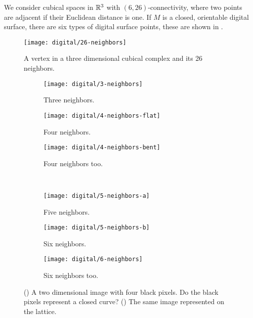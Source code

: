 We consider cubical spaces in $\mathbb{R}^3$ with $(6,26)$-connectivity,
where two points are adjacent if their Euclidean distance is one.
If $M$ is a closed, orientable digital surface, there are
six types of digital surface points, these are shown in .

\begin{figure}[htb]
        \centering
        \texttt{[image: digital/26-neighbors]}
		\caption{A vertex in a three dimensional cubical complex and its 26 neighbors.
		\label{fig:26-neighbors}}
\end{figure}


\begin{figure}[htb]
        \centering
        \begin{subfigure}[b]{0.2\textwidth}
        \texttt{[image: digital/3-neighbors]}
        \caption{Three neighbors.}
          \label{fig:3-neighbors}
        \end{subfigure}
          \hspace{.3cm}
         \begin{subfigure}[b]{0.25\textwidth}
        \texttt{[image: digital/4-neighbors-flat]}
        \caption{Four neighbors.}
        \label{fig:4-neighbors-flat}
        \end{subfigure}
         \hspace{.3cm}
         \begin{subfigure}[b]{0.2\textwidth}
        \texttt{[image: digital/4-neighbors-bent]}
        \caption{Four neighbors too.}
        \label{fig:4-neighbors-bent}
        \end{subfigure}\\
         \begin{subfigure}[b]{0.25\textwidth}
        \texttt{[image: digital/5-neighbors-a]}
        \caption{Five neighbors.}
          \label{fig:1-neighbors}
        \end{subfigure}
          \hspace{.2cm}
         \begin{subfigure}[b]{0.25\textwidth}
        \texttt{[image: digital/5-neighbors-b]}
        \caption{Six neighbors.}
        \label{fig:4-neighbors-flat}
        \end{subfigure}
         \hspace{.2cm}
         \begin{subfigure}[b]{0.25\textwidth}
        \texttt{[image: digital/6-neighbors]}
        \caption{Six neighbors too.}
        \label{fig:6-neighbors}
        \end{subfigure}
		\caption{() A two dimensional image with four black pixels.
		Do the black pixels represent a closed curve? () The same image
		represented on the lattice.
		\label{fig:4-square-and-dual}}
\end{figure}

